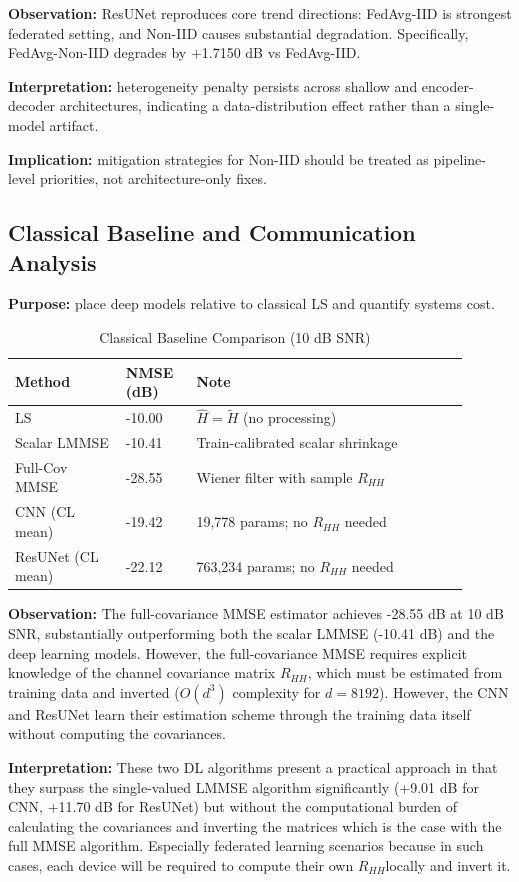 \documentclass{llncs}
\begin{document}
\textbf{Observation:} ResUNet reproduces core trend directions: FedAvg-IID is strongest federated setting, and Non-IID causes substantial degradation. Specifically, FedAvg-Non-IID degrades by +1.7150 dB vs FedAvg-IID.

\textbf{Interpretation:} heterogeneity penalty persists across shallow and encoder-decoder architectures, indicating a data-distribution effect rather than a single-model artifact.

\textbf{Implication:} mitigation strategies for Non-IID should be treated as pipeline-level priorities, not architecture-only fixes.

\subsection{Classical Baseline and Communication Analysis}
\textbf{Purpose:} place deep models relative to classical LS and quantify systems cost.

\begin{table}[htbp]
\caption{Classical Baseline Comparison (10 dB SNR)}
\label{tab:classical}
\centering
\begin{tabular}{p{0.22\linewidth}p{0.14\linewidth}p{0.54\linewidth}}
\toprule
Method & NMSE (dB) & Note \\
\midrule
LS & -10.00 & $\hat{H}=\tilde{H}$ (no processing) \\
Scalar LMMSE & -10.41 & Train-calibrated scalar shrinkage \\
Full-Cov MMSE & -28.55 & Wiener filter with sample $R_{HH}$ \\
\midrule
CNN (CL mean) & -19.42 & 19,778 params; no $R_{HH}$ needed \\
ResUNet (CL mean) & -22.12 & 763,234 params; no $R_{HH}$ needed \\
\bottomrule
\end{tabular}
\end{table}

\textbf{Observation:} The full-covariance MMSE estimator achieves -28.55 dB at 10 dB SNR, substantially outperforming both the scalar LMMSE (-10.41 dB) and the deep learning models. However, the full-covariance MMSE requires explicit knowledge of the channel covariance matrix $R_{HH}$, which must be estimated from training data and inverted ($O(d^3)$ complexity for $d=8192$). However, the CNN and ResUNet learn their estimation scheme through the training data itself without computing the covariances.

\textbf{Interpretation:} These two DL algorithms present a practical approach in that they surpass the single-valued LMMSE algorithm significantly (+9.01 dB for CNN, +11.70 dB for ResUNet) but without the computational burden of calculating the covariances and inverting the matrices which is the case with the full MMSE algorithm.
Especially federated learning scenarios because in such cases, each device will be required to compute their own $R_{HH}$locally and invert it.
\end{document}
